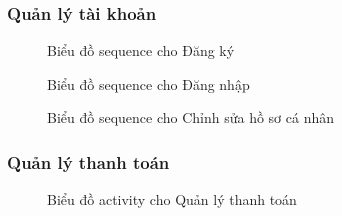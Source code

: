 \subsubsection{Quản lý tài khoản}
\begin{figure}[H]
	\centering
	
	\vspace{0.5cm}
	\caption{Biểu đồ sequence cho Đăng ký}
	\label{fig:enter-label}
\end{figure}
\begin{figure}[H]
	\centering
	
	\vspace{0.5cm}
	\caption{Biểu đồ sequence cho Đăng nhập}
	\label{fig:enter-label}
\end{figure}
\begin{figure}[H]
	\centering
	
	\vspace{0.5cm}
	\caption{Biểu đồ sequence cho Chỉnh sửa hồ sơ cá nhân}
	\label{fig:enter-label}
\end{figure}

\subsubsection{Quản lý thanh toán}
\begin{figure}[H]
    \centering
     
    \vspace{0.5cm}
    \caption{Biểu đồ activity cho Quản lý thanh toán}
    \label{fig:enter-label}
\end{figure}

